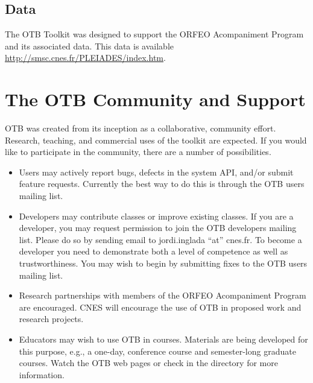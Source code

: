 \subsection{Data}
\label{sec:Data}

The OTB Toolkit was designed to support the ORFEO Acompaniment Program 
and its associated data. This data is available \url{http://smsc.cnes.fr/PLEIADES/index.htm}.


\section{The OTB Community and Support}
\label{sec:AdditionalResources}

OTB was created from its inception as a collaborative, community
effort. Research, teaching, and commercial uses of the toolkit are
expected. If you would like to participate in the community, there are a
number of possibilities.

\begin{itemize}
       \item Users may actively report bugs, defects in the system API,
       and/or submit feature requests. Currently the best way to do this is
       through the OTB users mailing list.

       \item Developers may contribute classes or improve existing
       classes. If you are a developer, you may request permission to join
       the OTB developers mailing list. Please do so by sending email to
       jordi.inglada ``at'' cnes.fr. To become a developer you need to
       demonstrate both a level of competence as well as
       trustworthiness. You may wish to begin by submitting fixes to the OTB
       users mailing list.

       \item Research partnerships with members of the ORFEO
       Acompaniment Program are encouraged. CNES will encourage the use of
       OTB in proposed work and research projects.


       \item Educators may wish to use OTB in courses. Materials are being
       developed for this purpose, e.g., a one-day, conference course and
       semester-long graduate courses. Watch the OTB web pages or check in
       the  directory for more information.
\end{itemize}

